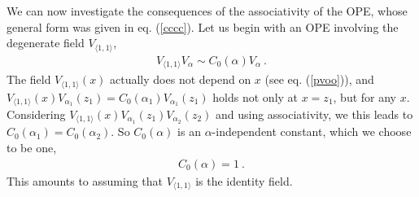\documentclass[12pt,a4paper,notitlepage]{report}
\numberwithin{equation}{section}
\theoremstyle{break}
\begin{document}
We can now investigate the consequences of the associativity of the OPE, whose general form was given in eq. (\ref{cccc}). Let us begin with an OPE involving the degenerate field  $V_{\langle 1,1 \rangle}$,
\begin{align}
\boxed{V_{\langle 1,1 \rangle}V_\alpha \sim  C_0(\alpha) V_\alpha} \ .
\end{align}
The field $V_{\langle 1,1 \rangle}(x)$ actually does not depend on $x$ (see eq. (\ref{pvoo})), and $V_{\langle 1,1 \rangle}(x)V_{\alpha_1}(z_1) = C_0(\alpha_1) V_{\alpha_1}(z_1)$ holds not only at $x=z_1$, but for any $x$. Considering  
$V_{\langle 1,1 \rangle}(x)V_{\alpha_1}(z_1)V_{\alpha_2}(z_2)$ and using associativity, we this leads to $C_0(\alpha_1)=C_0(\alpha_2)$. So $C_0(\alpha)$ 
is an $\alpha$-independent constant, which we choose to be one,
\begin{align}
\boxed{ C_0(\alpha) = 1}\ .
\label{cza}
\end{align}
This amounts to assuming that $V_{\langle 1,1 \rangle}$ is the identity field. 
\end{document}
